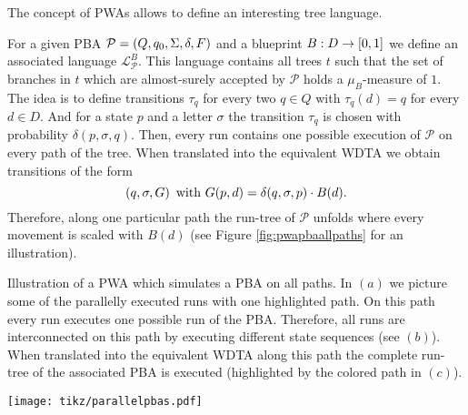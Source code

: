 The concept of \acp{PWA} allows to define an interesting tree language.
\begin{example}
  \cite[Proposition 43]{RandAutoInfTrees}
  For a given \ac{PBA} $\mathcal{P} = \left(Q, q_{0}, \Sigma, \delta, F\right)$ and
  a blueprint $B:D\rightarrow\left[0,1\right]$ we define an associated language 
  $\mathcal{L}_{\mathcal{P}}^{B}$. This language contains all trees $t$ such 
  that the set of branches in $t$ which are almost-surely accepted by 
  $\mathcal{P}$ holds a $\mu_{B}$-measure of $1$. The idea is to define 
  transitions $\tau_{q}$ for every two $q\in Q$ with $\tau_{q}(d) = q$ for 
  every $d\in D$. And for a state $p$ and a letter $\sigma$ the transition 
  $\tau_{q}$ is chosen with probability $\delta(p, \sigma, q)$. Then, every run
  contains one possible execution of $\mathcal{P}$ on every path of the tree.
  When translated into the equivalent \ac{WDTA} we obtain transitions of the
  form
  \begin{equation*}
    \left(q, \sigma, G\right)\text{ with }G(p,d) = \delta(q,\sigma, p)\cdot B(d).
  \end{equation*}
  Therefore, along one particular path the run-tree of $\mathcal{P}$ unfolds
  where every movement is scaled with $B(d)$ (see Figure 
  \ref{fig:pwapbaallpaths} for an illustration).
  \label{ex:pwapbaallpaths}
\end{example}
\begin{drawing}
  \caption{Illustration of a \ac{PWA} which simulates a \ac{PBA} on all paths. 
  In $(a)$ we picture some of the parallelly executed runs with one highlighted
  path. On this path every run executes one possible run of the \ac{PBA}.
  Therefore, all runs are interconnected on this path by executing different
  state sequences (see $(b)$). When translated into the equivalent \ac{WDTA}
  along this path the complete run-tree of the associated \ac{PBA} is executed
  (highlighted by the colored path in $(c)$).}
  \label{fig:pwapbaallpaths}
  \begin{center}
    \texttt{[image: tikz/parallelpbas.pdf]}
  \end{center}
\end{drawing}

